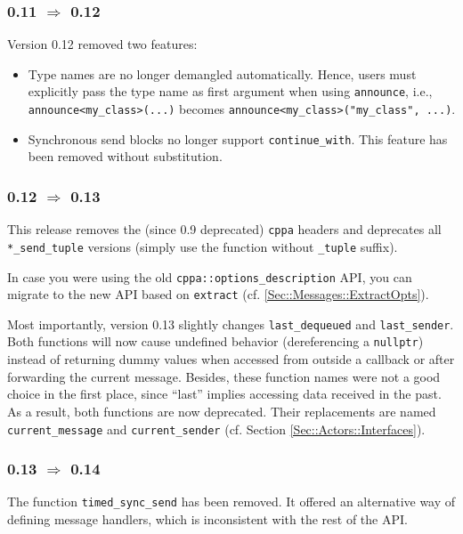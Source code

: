 \clearpage
\subsubsection{0.11 $\Rightarrow$ 0.12}

Version 0.12 removed two features:

\begin{itemize}
\item
Type names are no longer demangled automatically.
Hence, users must explicitly pass the type name as first argument when using \lstinline^announce^, i.e., \lstinline^announce<my_class>(...)^ becomes \lstinline^announce<my_class>("my_class", ...)^.

\item
Synchronous send blocks no longer support \lstinline^continue_with^.
This feature has been removed without substitution.
\end{itemize}

\subsubsection{0.12 $\Rightarrow$ 0.13}

This release removes the (since 0.9 deprecated) \lstinline^cppa^ headers and deprecates all \lstinline^*_send_tuple^ versions (simply use the function without \lstinline^_tuple^ suffix).

In case you were using the old \lstinline^cppa::options_description^ API, you can migrate to the new API based on \lstinline^extract^ (cf. \ref{Sec::Messages::ExtractOpts}).

Most importantly, version 0.13 slightly changes \lstinline^last_dequeued^ and \lstinline^last_sender^.
Both functions will now cause undefined behavior (dereferencing a \lstinline^nullptr^) instead of returning dummy values when accessed from outside a callback or after forwarding the current message.
Besides, these function names were not a good choice in the first place, since ``last'' implies accessing data received in the past.
As a result, both functions are now deprecated.
Their replacements are named \lstinline^current_message^ and \lstinline^current_sender^ (cf. Section \ref{Sec::Actors::Interfaces}).

\subsubsection{0.13 $\Rightarrow$ 0.14}

The function \lstinline^timed_sync_send^ has been removed. It offered an alternative way of defining message handlers, which is inconsistent with the rest of the API.
